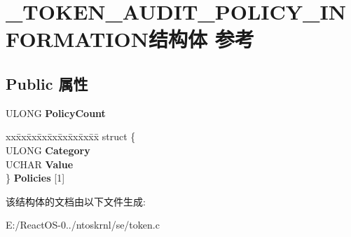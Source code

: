 \hypertarget{struct___t_o_k_e_n___a_u_d_i_t___p_o_l_i_c_y___i_n_f_o_r_m_a_t_i_o_n}{}\section{\+\_\+\+T\+O\+K\+E\+N\+\_\+\+A\+U\+D\+I\+T\+\_\+\+P\+O\+L\+I\+C\+Y\+\_\+\+I\+N\+F\+O\+R\+M\+A\+T\+I\+O\+N结构体 参考}
\label{struct___t_o_k_e_n___a_u_d_i_t___p_o_l_i_c_y___i_n_f_o_r_m_a_t_i_o_n}
\subsection*{Public 属性}
\begin{DoxyCompactItemize}
\item 
\mbox{\label{struct___t_o_k_e_n___a_u_d_i_t___p_o_l_i_c_y___i_n_f_o_r_m_a_t_i_o_n_a8809da55e1d919a0a781ea0668aed29e}} 
U\+L\+O\+NG {\bfseries Policy\+Count}
\item 
\mbox{\label{struct___t_o_k_e_n___a_u_d_i_t___p_o_l_i_c_y___i_n_f_o_r_m_a_t_i_o_n_a0e7554192962ff1c4e1558925d33a0ff}} 
\begin{tabbing}
xx\=xx\=xx\=xx\=xx\=xx\=xx\=xx\=xx\=\kill
struct \{\\
\>ULONG {\bfseries Category}\\
\>UCHAR {\bfseries Value}\\
\} {\bfseries Policies} \mbox{[}1\mbox{]}\\

\end{tabbing}\end{DoxyCompactItemize}


该结构体的文档由以下文件生成\+:\begin{DoxyCompactItemize}
\item 
E\+:/\+React\+O\+S-\/0../ntoskrnl/se/token.\+c\end{DoxyCompactItemize}

